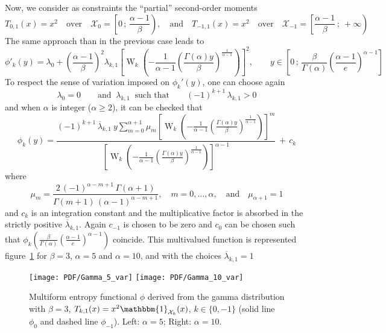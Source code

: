 \documentclass[english,onecolumn]{elsarticle}
\def\X{\mathcal{X}}
\def\un{\mathbbm{1}}
\def\W{\operatorname{W}}
\begin{document}
Now, we consider as constraints the ``partial'' second-order moments
%
\[
T_{0,1}(x) = x^2 \quad \mbox{over} \quad \X_0 = \left[ 0 \, ; \,
\frac{\alpha-1}{\beta} \right), \quad \mbox{and} \quad T_{-1,1}(x) = x^2 \quad
\mbox{over} \quad \X_{-1} = \left[\frac{\alpha-1}{\beta} \, ; \: + \infty
\right)
\]
%
The same approach than in the previous case leads to
%
\[
\phi'_k(y) = \lambda_0 + \left(\frac{\alpha-1}{\beta}\right)^2 \lambda_{k,1}
\left[ \W_k \left( - \frac{1}{\alpha-1} \left( \frac{\Gamma(\alpha) y}{\beta}
\right)^{\frac{1}{\alpha-1}} \right) \right]^2, \qquad y \in \left[ 0 \, ; \,
\frac{\beta}{\Gamma(\alpha)} \left( \frac{\alpha-1}{e}\right)^{\alpha-1} \right]
\]
%
To respect the sense of variation imposed on $\phi_k'(y)$, one can choose again
%
\[
\lambda_0 = 0 \qquad \mbox{and } \: \lambda_{k,1} \: \mbox{ such that} \qquad
(-1)^{k+1} \, \lambda_{k,1} > 0
\]
%
and when $\alpha$ is integer ($\alpha \ge 2$), it can be checked that
%
\[
\phi_k(y) = \frac{\displaystyle (-1)^{k+1} \, \overline{\lambda}_{k,1} \: y
\sum_{m=0}^{\alpha+1} \mu_m \left[\W_k\left(- \frac{1}{\alpha-1} \left(
\frac{\Gamma(\alpha) y}{\beta} \right)^{\frac{1}{\alpha-1}} \right)
\right]^m}{\left[\W_k\left(- \frac{1}{\alpha-1} \left( \frac{\Gamma(\alpha)
y}{\beta} \right)^{\frac{1}{\alpha-1}} \right) \right]^{\alpha-1}} \, + \, c_k
\]
%
where
%
\[
\mu_m = \frac{2 \, (-1)^{\alpha-m+1} \, \Gamma(\alpha+1)}{\Gamma(m+1) \,
(\alpha-1)^{\alpha-m+1}}, \quad m = 0, \ldots, \alpha, \quad \mbox{and} \quad
\mu_{\alpha+1} = 1
\]
%
and $c_k$ is  an integration constant and the  multiplicative factor is absorbed
in the strictly positive  $\overline{\lambda}_{k,1}$. Again $c_{-1}$ is chosen to
be    zero    and   $c_0$    can    be    chosen    such   that    $\phi_k\left(
  \frac{\beta}{\Gamma(\alpha)}   \left(   \frac{\alpha-1}{e}  \right)^{\alpha-1}
\right)$    coincide.      This    multivalued    function     is    represented
figure~\ref{fig:Entropy-gamma-var} for $\beta  = 3$, $\alpha = 5$  and $\alpha =
10$, and with the choices $\overline{\lambda}_{k,1} = 1$
%
\begin{figure}[htbp]
\centerline{
\texttt{[image: PDF/Gamma\_5\_var]} \hspace{2mm}
\texttt{[image: PDF/Gamma\_10\_var]}}
%
\caption{Multiform entropy functional $\phi$ derived from the gamma distribution
  with $\beta = 3$, $T_{k,1}(x) = x^2 \un_{\X_k}(x)$, $k \in \{0 , -1 \}$ (solid
  line $\phi_0$ and dashed line $\phi_{-1}$). Left: $\alpha = 5$; Right: $\alpha
  = 10$.}
\label{fig:Entropy-gamma-var}
\end{figure}
\end{document}
